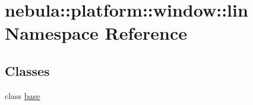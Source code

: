\hypertarget{namespacenebula_1_1platform_1_1window_1_1lin}{
\section{nebula::platform::window::lin Namespace Reference}
\label{namespacenebula_1_1platform_1_1window_1_1lin}
}
\subsection*{Classes}
\begin{DoxyCompactItemize}
\item 
class \hyperlink{classnebula_1_1platform_1_1window_1_1lin_1_1base}{base}
\end{DoxyCompactItemize}
